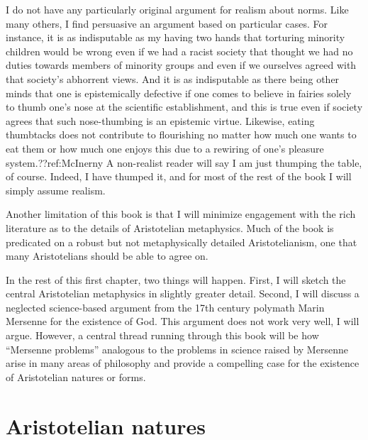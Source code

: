 I do not have any particularly original argument for realism about norms. Like many others, I find persuasive an argument based on particular
cases. For instance, it is as indisputable as my having two hands that torturing minority children would be wrong even if we had 
a racist society that thought we had no duties towards members of minority groups and even if we ourselves agreed with 
that society's abhorrent views. And it is as indisputable as there being other minds that one is epistemically defective if one comes 
to believe in fairies solely to thumb one's nose at the scientific establishment, and this is true even if society agrees 
that such nose-thumbing is an epistemic virtue. Likewise, eating thumbtacks does not contribute to flourishing no matter how much one wants 
to eat them or how much one enjoys this due to a rewiring of one's pleasure system.??ref:McInerny A non-realist reader will say I am just thumping the table, of course. 
Indeed, I have thumped it, and for most of the rest of the book I will simply assume realism.

Another limitation of this book is that I will minimize engagement with the rich literature as to the details of
Aristotelian metaphysics. Much of the book is predicated on a robust but not metaphysically detailed Aristotelianism,
one that many Aristotelians should be able to agree on.

In the rest of this first chapter, two things will happen. First, I will sketch the central Aristotelian metaphysics in slightly
greater detail. Second, I will discuss a neglected science-based argument from the 17th century polymath Marin Mersenne for the existence 
of God. This argument does not work very well, I will argue. However, a central thread running through this book will be how ``Mersenne 
problems'' analogous to the problems in science raised by Mersenne arise in many areas of philosophy and provide a compelling 
case for the existence of Aristotelian natures or forms.

\section{Aristotelian natures}
